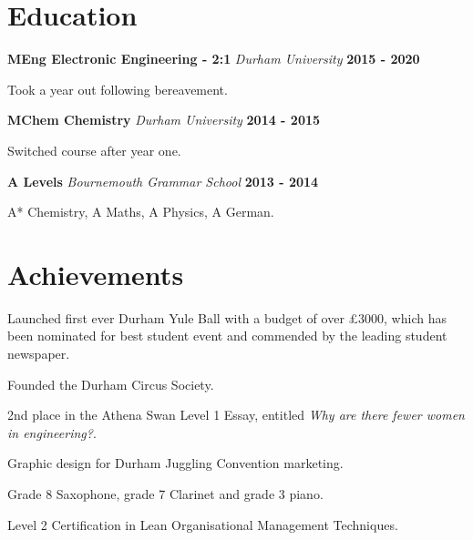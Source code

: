 \documentclass[a4paper, 12pt, hidelinks]{article}
\newcommand{\xp}[3]{
	\vspace{0.25em}
	\textbf{#1} \quad \emph{#2} \hfill \textbf{#3}
}
\begin{document}
\begin{minipage}{0.587\textwidth}
		\section{Education}
		\xp{MEng Electronic Engineering - 2:1}{Durham University}{2015 - 2020}
		\begin{itemise}
			\item Took a year out following bereavement.
		\end{itemise}
		\xp{MChem Chemistry}{Durham University}{2014 - 2015}
		\begin{itemise}
			\item Switched course after year one.
		\end{itemise}
		\xp{A Levels}{Bournemouth Grammar School}{2013 - 2014}
		\begin{itemise}
			\item A* Chemistry, A Maths, A Physics, A German.
		\end{itemise}
		
		\section{Achievements}
		\begin{itemise}[1em][-0.25em][0em]
			\item Launched first ever Durham Yule Ball with a budget of over £3000, which has been nominated for best student event and commended by the leading student newspaper.
			\hfill \href{https://www.palatinate.org.uk/things-you-need-to-do-in-durham-before-graduating/}{\faExternalLink}
			\item Founded the Durham Circus Society.
			\item 2nd place in the Athena Swan Level 1 Essay, entitled \emph{Why are there fewer women in engineering?}.
			\hfill \href{https://www.dur.ac.uk/experience/news/?itemno=27469}{\faExternalLink}
			\item Graphic design for Durham Juggling Convention marketing.
			\item Grade 8 Saxophone, grade 7 Clarinet and grade 3 piano.
			\item Level 2 Certification in Lean Organisational Management Techniques.
		\end{itemise}
	\end{minipage}
\end{document}
